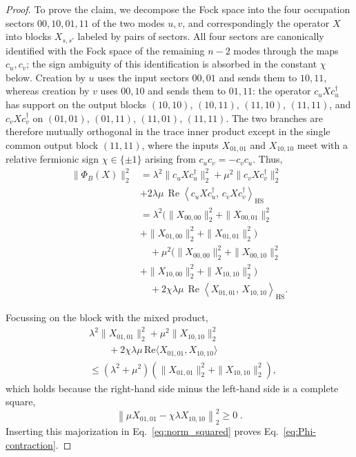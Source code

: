 \documentclass[prx,twocolumn,superscriptaddress,aps,10pt, frontmatterverbose, reprint,footinbib,longbibliography=true]{revtex4-2}
\begin{document}
\begin{proof}
To prove the claim, we decompose the Fock space into the four occupation sectors $00,10,01,11$ of the two modes $u,v$, and correspondingly the operator $X$ into blocks $X_{s,s'}$ labeled by pairs of sectors. All four sectors are canonically identified with the Fock space of the remaining $n-2$ modes through the maps $c_u,c_v$; the sign ambiguity of this identification is absorbed in the constant $\chi$ below. Creation by $u$ uses the input sectors $00,01$ and sends them to $10,11$, whereas creation by $v$ uses $00,10$ and sends them to $01,11$: the operator $c_uXc_u^\dagger$ has support on the output blocks $(10,10)$, $(10,11)$, $(11,10)$, $(11,11)$, and $c_vXc_v^\dagger$ on $(01,01)$, $(01,11)$, $(11,01)$, $(11,11)$. The two branches are therefore mutually orthogonal in the trace inner product except in the single common output block $(11,11)$, where the inputs $X_{01,01}$ and $X_{10,10}$ meet with a relative fermionic sign $\chi\in\{\pm1\}$ arising from $c_uc_v=-c_vc_u$.
Thus, 
\begin{equation}
\label{eq:norm_squared}
\begin{aligned}
\|\Phi_B(X)\|_2^2
&=
\lambda^2 \|c_u X c_u^\dagger\|_2^2
+\mu^2 \|c_v X c_v^\dagger\|_2^2
\\
&+2\lambda\mu\,
\operatorname{Re}
\left\langle
c_u X c_u^\dagger,\,
c_v X c_v^\dagger
\right\rangle_{\mathrm{HS}}
\\[1ex]
&=
\lambda^2
(
\|X_{00,00}\|_2^2
+\|X_{00,01}\|_2^2
\\
&+\|X_{01,00}\|_2^2
+\|X_{01,01}\|_2^2 )
\\
&\quad
+\mu^2
(
\|X_{00,00}\|_2^2
+\|X_{00,10}\|_2^2
\\
&+\|X_{10,00}\|_2^2
+\|X_{10,10}\|_2^2 )
\\
&\quad
+2\chi\lambda\mu\,
\operatorname{Re}
\left\langle
X_{01,01},\,X_{10,10}
\right\rangle_{\mathrm{HS}} .
\end{aligned}
\end{equation}

Focussing on the block with the mixed product,
\begin{equation}
\begin{split}
    &\lambda^2\|X_{01,01}\|_2^2+\mu^2\|X_{10,10}\|_2^2\\
    &\qquad +2\chi\lambda\mu\,\mathrm{Re}\langle X_{01,01},X_{10,10}\rangle\\
    &\le(\lambda^2+\mu^2)\left(\|X_{01,01}\|_2^2+\|X_{10,10}\|_2^2\right),
\end{split}\end{equation}
which holds because the right-hand side minus the  left-hand side is a complete square,
\begin{equation}
    \left\|\mu X_{01,01}-\chi\lambda X_{10,10}\right\|_2^2\ge0\;.
\end{equation}
Inserting this majorization in Eq.~\eqref{eq:norm_squared} proves Eq.~\eqref{eq:Phi-contraction}.


\end{proof}
\end{document}
